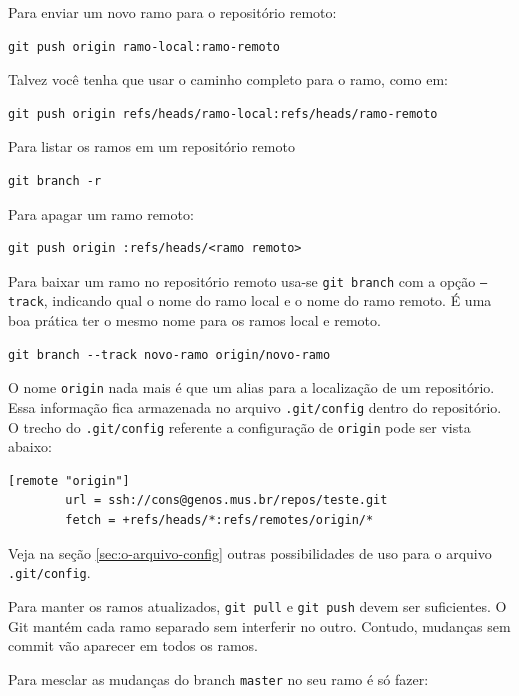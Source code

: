 \documentclass[12pt,brazil]{book}
\begin{document}
Para enviar um novo ramo para o repositório remoto:

\begin{verbatim}
git push origin ramo-local:ramo-remoto
\end{verbatim}

Talvez você tenha que usar o caminho completo para o ramo, como em:

\begin{verbatim}
git push origin refs/heads/ramo-local:refs/heads/ramo-remoto
\end{verbatim}

Para listar os ramos em um repositório remoto

\begin{verbatim}
git branch -r
\end{verbatim}

Para apagar um ramo remoto:

\begin{verbatim}
git push origin :refs/heads/<ramo remoto>
\end{verbatim}

Para baixar um ramo no repositório remoto usa-se \texttt{git branch}
com a opção \texttt{--track}, indicando qual o nome do ramo local e o
nome do ramo remoto. É uma boa prática ter o mesmo nome para os ramos
local e remoto.

\begin{verbatim}
git branch --track novo-ramo origin/novo-ramo
\end{verbatim}

O nome \texttt{origin} nada mais é que um alias para a localização de
um repositório. Essa informação fica armazenada no arquivo
\texttt{.git/config} dentro do repositório. O trecho do
\texttt{.git/config} referente a configuração de \texttt{origin} pode
ser vista abaixo:

\begin{verbatim}
[remote "origin"]
        url = ssh://cons@genos.mus.br/repos/teste.git
        fetch = +refs/heads/*:refs/remotes/origin/*
\end{verbatim}

Veja na seção \ref{sec:o-arquivo-config} outras possibilidades de uso
para o arquivo \texttt{.git/config}.

Para manter os ramos atualizados, \texttt{git pull} e \texttt{git
  push} devem ser suficientes. O Git mantém cada ramo separado sem
interferir no outro. Contudo, mudanças sem commit vão aparecer em
todos os ramos.

Para mesclar as mudanças do branch \texttt{master} no seu ramo é só
fazer:
\end{document}
